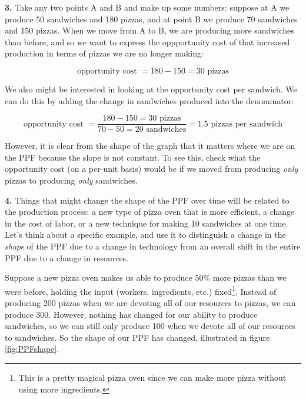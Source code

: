\documentclass[12pt]{article}
\begin{document}
\medskip

\textbf{3.} Take any two points A and B and make up some numbers: suppose at A we produce 50 sandwiches and 180 pizzas, and at point B we produce 70 sandwiches and 150 pizzas. When we move from A to B, we are producing more sandwiches than before, and so we want to express the oppportunity cost of that increased production in terms of pizzas we are no longer making:

$$
\text{opportunity cost } = 180 - 150 = 30 \text{ pizzas}
$$

We also might be interested in looking at the opportunity cost per sandwich. We can do this by adding the change in sandwiches produced into the denominator:

$$
\text{opportunity cost } = \dfrac{180 - 150 = 30 \text{ pizzas}}{70-50 = 20 \text{ sandwiches}} = 1.5 \text{ pizzas per sandwich}
$$

However, it is clear from the shape of the graph that it matters where we are on the PPF because the slope is not constant. To see this, check what the opportunity cost (on a per-unit basis) would be if we moved from producing \textit{only} pizzas to producing \textit{only} sandwiches.

\medskip

\textbf{4.} Things that might change the shape of the PPF over time will be related to the production process: a new type of pizza oven that is more efficient, a change in the cost of labor, or a new technique for making 10 sandwiches at one time. Let's think about a specific example, and use it to distinguish a change in the \textit{shape} of the PPF due to a change in technology from an overall shift in the entire PPF due to a change in resources.

\medskip

Suppose a new pizza oven makes us able to produce 50\% more pizzas than we were before, holding the input (workers, ingredients, etc.) fixed\footnote{This is a pretty magical pizza oven since we can make more pizza without using more ingredients.}. Instead of producing 200 pizzas when we are devoting all of our resources to pizzas, we can produce 300. However, nothing has changed for our ability to produce sandwiches, so we can still only produce 100 when we devote all of our resources to sandwiches. So the shape of our PPF has changed, illustrated in figure \ref{fig:PPFshape}. 
\end{document}
